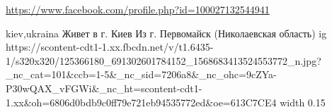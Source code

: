  
 
 
 
 

\url{https://www.facebook.com/profile.php?id=100027132544941}\par
kiev,ukraina
Живет в г. Киев
Из г. Первомайск (Николаевская область)
\ifcmt
  ig https://scontent-cdt1-1.xx.fbcdn.net/v/t1.6435-1/s320x320/125366180_691302601784152_1568683413524553772_n.jpg?_nc_cat=101&ccb=1-5&_nc_sid=7206a8&_nc_ohc=9cZYa-P30wQAX_vFGWi&_nc_ht=scontent-cdt1-1.xx&oh=6806d0bdb9c0ff79e721eb94535772ed&oe=613C7CE4
  width 0.15
\fi


